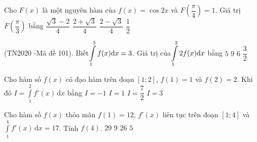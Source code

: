 \begin{ex}%
	Cho $F(x)$ là một nguyên hàm của $f(x)=\cos 2x$ và $F\left(\dfrac{\pi}{4}\right)=1$. Giá trị $F\left(\dfrac{\pi}{3}\right)$ bằng
	\choice
	{$\dfrac{\sqrt{3}-2}{4}$}
	{\True $\dfrac{2+\sqrt{3}}{4}$}
	{$\dfrac{2-\sqrt{3}}{4}$}
	{$\dfrac{1}{2}$}
\end{ex}

\begin{ex} (TN2020 -Mã đề 101).
	Biết$\displaystyle\displaystyle\int \limits_1^3{f(x) \text{d}x}=3$. Giá trị của$\displaystyle\displaystyle\int \limits_1^3{2f(x) \text{d}x}$ bằng
	\choice
	{$5$}
	{$9$}
	{\True$6$}
	{$\dfrac{3}{2}$}
\end{ex}

\begin{ex}%
	Cho hàm số $ f(x)$ có đạo hàm trên đoạn $ [1; 2] $, $ f(1)=1 $ và $ f(2)=2 $. Khi đó $ I=\displaystyle\int\limits_1^2 f'(x)\mathrm{ \,d}x $ bằng
	\choice
	{$I=-1$}
	{\True $I=1$}
	{$I=\dfrac{7}{2}$}
	{$I=3$}
\end{ex}

\begin{ex}%
	Cho hàm số $f(x)$ thỏa mãn $f(1)=12$, $f'(x)$ liên tục trên đoạn $[1;4]$ và $\displaystyle \int\limits_{1}^{4} f'(x) \mathrm{\, d}x = 17$. Tính $f(4)$. 
	\choice
	{\True $29$}
	{$9$}
	{$26$}
	{$5$}
\end{ex}

